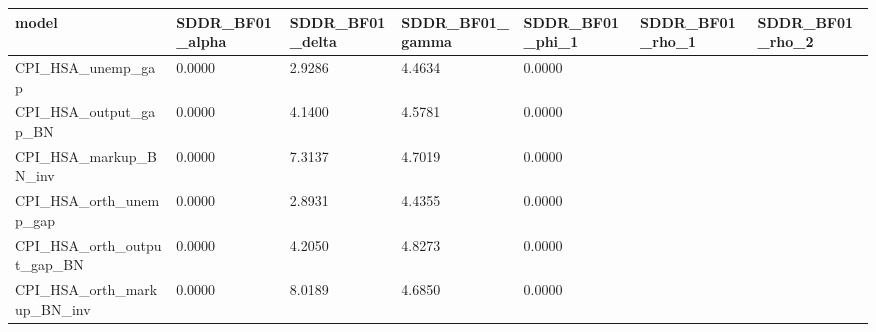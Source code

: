 \begin{tabular}{lllllll}
\toprule
model & SDDR_BF01_alpha & SDDR_BF01_delta & SDDR_BF01_gamma & SDDR_BF01_phi_1 & SDDR_BF01_rho_1 & SDDR_BF01_rho_2 \\
\midrule
CPI_HSA_unemp_gap & 0.0000 & 2.9286 & 4.4634 & 0.0000 &  &  \\
CPI_HSA_output_gap_BN & 0.0000 & 4.1400 & 4.5781 & 0.0000 &  &  \\
CPI_HSA_markup_BN_inv & 0.0000 & 7.3137 & 4.7019 & 0.0000 &  &  \\
CPI_HSA_orth_unemp_gap & 0.0000 & 2.8931 & 4.4355 & 0.0000 &  &  \\
CPI_HSA_orth_output_gap_BN & 0.0000 & 4.2050 & 4.8273 & 0.0000 &  &  \\
CPI_HSA_orth_markup_BN_inv & 0.0000 & 8.0189 & 4.6850 & 0.0000 &  &  \\
\bottomrule
\end{tabular}
